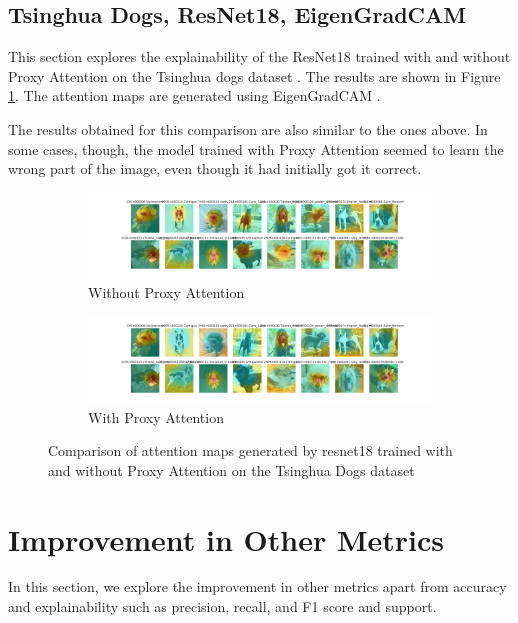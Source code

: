 \documentclass[a4paper,11pt,openright]{book}
\begin{document}
\subsection{Tsinghua Dogs, ResNet18, EigenGradCAM}
This section explores the explainability of the ResNet18 \cite{heDeepResidualLearning2016} trained with and without Proxy Attention on the Tsinghua dogs dataset \cite{zouNewDatasetDog2020}. The results are shown in Figure \ref{fig:resnet18_tsing}. The attention maps are generated using EigenGradCAM \cite{banymuhammadEigenCAMVisualExplanations2021}.

The results obtained for this comparison are also similar to the ones above. In some cases, though, the model trained with Proxy Attention seemed to learn the wrong part of the image, even though it had initially got it correct.

\begin{figure}[!htb]
    \begin{subfigure}[b]{1\textwidth}
        \includegraphics[width=\linewidth]{images/tsing_resnet18_noproxy_0.pdf}
        \caption{Without Proxy Attention}
    \end{subfigure}
    \begin{subfigure}[b]{1\textwidth}
        \includegraphics[width=\linewidth]{images/tsing_resnet18_proxy_0.pdf}
        \caption{With Proxy Attention}
    \end{subfigure}
    \caption{Comparison of attention maps generated by resnet18 trained with and without Proxy Attention on the Tsinghua Dogs dataset}
    \label{fig:resnet18_tsing}
\end{figure}

\section{Improvement in Other Metrics}
In this section, we explore the improvement in other metrics apart from accuracy and explainability such as precision, recall, and F1 score and support.\\
\end{document}
